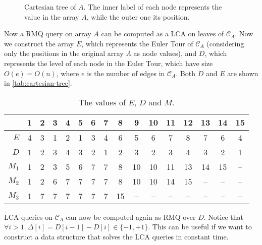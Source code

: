 \begin{enumerate}
\begin{figure}[b]
    \caption{Cartesian tree of $A$. The inner label of each node represents the
    value in the array $A$, while the outer one its position.}

    \label{fig:cartesian-tree}
  \end{figure}
  Now a RMQ query on array $A$ can be computed as a LCA on leaves of
  $\mathcal{C}_A$. Now we construct the array $E$, which represents the Euler
  Tour of $\mathcal{C}_A$ (considering only the positions in the original array
  $A$ as node values), and $D$, which represents the level of each node in the
  Euler Tour, which have size $O(e) = O(n)$, where $e$ is the number of edges in
  $\mathcal{C}_A$. Both $D$ and $E$ are shown in \autoref{tab:cartesian-tree}.
  \begin{table}[t]
    \centering
    \begin{tabular}{|r||c|c|c|c|c|c|c|c|c|c|c|c|c|c|c|}
      \multicolumn{1}{c}{} & \multicolumn{1}{c}{\tiny 1} &
      \multicolumn{1}{c}{\tiny 2} & \multicolumn{1}{c}{\tiny 3} &
      \multicolumn{1}{c}{\tiny 4} & \multicolumn{1}{c}{\tiny 5} &
      \multicolumn{1}{c}{\tiny 6} & \multicolumn{1}{c}{\tiny 7} &
      \multicolumn{1}{c}{\tiny 8} & \multicolumn{1}{c}{\tiny 9} &
      \multicolumn{1}{c}{\tiny 10} & \multicolumn{1}{c}{\tiny 11} &
      \multicolumn{1}{c}{\tiny 12} & \multicolumn{1}{c}{\tiny 13} &
      \multicolumn{1}{c}{\tiny 14} &
      \multicolumn{1}{c}{\tiny 15} \\\hline
      $E$ & 4 & 3 & 1 & 2 & 1 & 3 & 4 & 6 & 5 & 6 & 7 & 8 & 7 & 6 & 4 \\\hline
      $D$ & 1 & 2 & 3 & 4 & 3 & 2 & 1 & 2 & 3 & 2 & 3 & 4 & 3 & 2 & 1 \\\hline\hline
      $M_1$ & 1 & 2 & 3 & 5 & 6 & 7 & 7 & 8 & 10 & 10 & 11 & 13 & 14 & 15 & -- \\
      $M_2$ & 1 & 2 & 6 & 7 & 7 & 7 & 7 & 8 & 10 & 10 & 14 & 15 & -- & -- & -- \\
      $M_3$ & 1 & 7 & 7 & 7 & 7 & 7 & 7 & 15 & -- & -- & -- & -- & -- & -- & -- \\\hline
    \end{tabular}

    \caption{The values of $E$, $D$ and $M$.}
    \label{tab:cartesian-tree}

  \end{table}
  LCA queries on $\mathcal{C}_A$ can now be computed again as RMQ over $D$.
  Notice that $\forall i > 1.\ \Delta[i] = D[i - 1] - D[i] \in \{-1, +1\}$. This
  can be useful if we want to construct a data structure that solves the LCA
  queries in constant time.


\end{enumerate}
